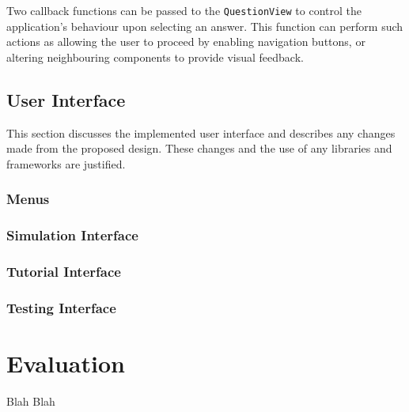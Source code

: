 \documentclass[bsc,twoside,singlespacing,parskip,logo,notimes,normalheadings]{infthesis}
\begin{document}
        Two callback functions can be passed to the {\tt QuestionView}
        to control the application's behaviour upon selecting an
        answer. This function can perform such actions as allowing the
        user to proceed by enabling navigation buttons, or altering
        neighbouring components to provide visual feedback.
            
    \section{User Interface}
    This section discusses the implemented user interface and
    describes any changes made from the proposed design. These changes
    and the use of any libraries and frameworks are justified.
    
        \subsection{Menus}

        \subsection{Simulation Interface}

        \subsection{Tutorial Interface}

        \subsection{Testing Interface}

\chapter{Evaluation}
Blah Blah



\end{document}
